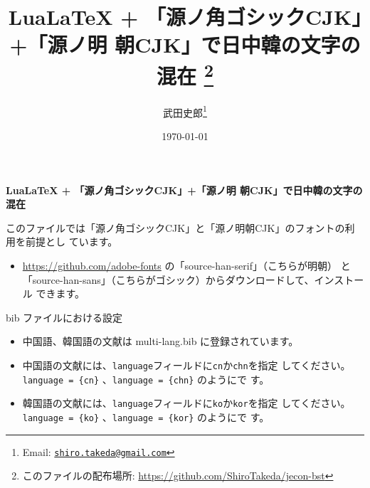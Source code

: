 \documentclass[article]{jlreq}
\title{\textbf{LuaLaTeX + 「源ノ角ゴシックCJK」+「源ノ明
 朝CJK」で日中韓の文字の混在}
\thanks{このファイルの配布場所: \url{https://github.com/ShiroTakeda/jecon-bst}}
}
\author{武田史郎\thanks{Email:
\texttt{\href{mailto:shiro.takeda@gmail.com}{shiro.takeda@gmail.com}}}}
\date{\today}
\begin{document}

\begin{flushleft}
{\Large \textbf{LuaLaTeX + 「源ノ角ゴシックCJK」+「源ノ明
 朝CJK」で日中韓の文字の混在}} 
\end{flushleft}

\vspace*{1em}

このファイルでは「源ノ角ゴシックCJK」と「源ノ明朝CJK」のフォントの利用を前提とし
ています。
\begin{itemize}
 \item \url{https://github.com/adobe-fonts} の「source-han-serif」（こちらが明朝）
       と「source-han-sans」（こちらがゴシック）からダウンロードして、インストール
       できます。
\end{itemize}

\vspace*{1em}

bib ファイルにおける設定
\begin{itemize}
 \item 中国語、韓国語の文献は multi-lang.bib に登録されています。
 \item 中国語の文献には、\verb|language|フィールドに\verb|cn|か\verb|chn|を指定
       してください。\verb|language = {cn}| 、\verb|language = {chn}| のようにで
       す。
 \item 韓国語の文献には、\verb|language|フィールドに\verb|ko|か\verb|kor|を指定
       してください。\verb|language = {ko}| 、\verb|language = {kor}| のようにで
       す。
\end{itemize}
\end{document}
